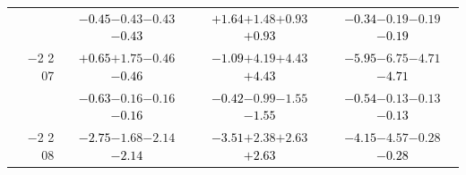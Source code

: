 \documentclass[compress]{beamer}
\begin{document}
\begin{frame}
\begin{tabular}{r | c | c | c}
          & \textcolor{black}{$-0.45$}\hspace{0.1 cm}$-0.43$\hspace{0.1 cm}$-0.43$\hspace{0.1 cm}\textcolor{black}{$-0.43$} & \textcolor{black}{$+1.64$}\hspace{0.1 cm}$+1.48$\hspace{0.1 cm}$+0.93$\hspace{0.1 cm}\textcolor{black}{$+0.93$} & \textcolor{black}{$-0.34$}\hspace{0.1 cm}$-0.19$\hspace{0.1 cm}$-0.19$\hspace{0.1 cm}\textcolor{black}{$-0.19$} \\
$-$2 2 07 & \textcolor{black}{$+0.65$}\hspace{0.1 cm}$+1.75$\hspace{0.1 cm}$-0.46$\hspace{0.1 cm}\textcolor{black}{$-0.46$} & \textcolor{black}{$-1.09$}\hspace{0.1 cm}$+4.19$\hspace{0.1 cm}$+4.43$\hspace{0.1 cm}\textcolor{black}{$+4.43$} & \textcolor{black}{$-5.95$}\hspace{0.1 cm}$-6.75$\hspace{0.1 cm}$-4.71$\hspace{0.1 cm}\textcolor{black}{$-4.71$} \\
          & \textcolor{black}{$-0.63$}\hspace{0.1 cm}$-0.16$\hspace{0.1 cm}$-0.16$\hspace{0.1 cm}\textcolor{black}{$-0.16$} & \textcolor{black}{$-0.42$}\hspace{0.1 cm}$-0.99$\hspace{0.1 cm}$-1.55$\hspace{0.1 cm}\textcolor{black}{$-1.55$} & \textcolor{black}{$-0.54$}\hspace{0.1 cm}$-0.13$\hspace{0.1 cm}$-0.13$\hspace{0.1 cm}\textcolor{black}{$-0.13$} \\
$-$2 2 08 & \textcolor{black}{$-2.75$}\hspace{0.1 cm}$-1.68$\hspace{0.1 cm}$-2.14$\hspace{0.1 cm}\textcolor{black}{$-2.14$} & \textcolor{black}{$-3.51$}\hspace{0.1 cm}$+2.38$\hspace{0.1 cm}$+2.63$\hspace{0.1 cm}\textcolor{black}{$+2.63$} & \textcolor{black}{$-4.15$}\hspace{0.1 cm}$-4.57$\hspace{0.1 cm}$-0.28$\hspace{0.1 cm}\textcolor{black}{$-0.28$} \\

\end{tabular}
\end{frame}
\end{document}
